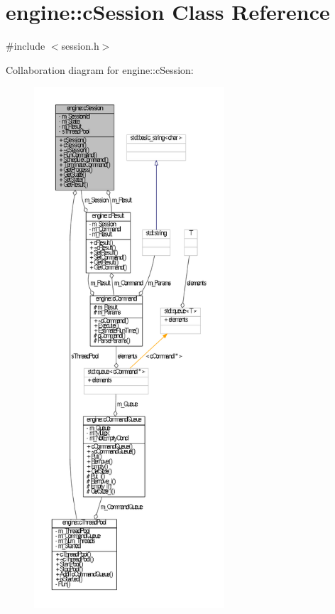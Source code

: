 \hypertarget{classengine_1_1cSession}{\section{engine\-:\-:c\-Session \-Class \-Reference}
\label{classengine_1_1cSession}
}


{\ttfamily \#include $<$session.\-h$>$}



\-Collaboration diagram for engine\-:\-:c\-Session\-:\nopagebreak
\begin{figure}[H]
\begin{center}
\leavevmode
\includegraphics[height=550pt]{classengine_1_1cSession__coll__graph}
\end{center}
\end{figure}
